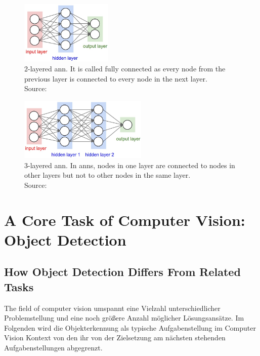 \documentclass[
			   fontsize=11pt,
               paper=a4,
               bibliography=totoc,
               idxtotoc,
               headsepline,
               footsepline,
               footinclude=false,
               BCOR=12mm,
               DIV=13,
               openany,   %
               ]
               {scrbook}
\begin{document}
\begin{multicols}{2} %
	\begin{figure}[H] %
		\centering
		\includegraphics[height=3cm]{figures/ann1.jpeg}
		\caption[2-Layered ANN]{2-layered \gls{ann}. It is called fully connected as every node from the previous layer is connected to every node in the next layer. \\
			\tiny{Source:~\cite{annGraphics}}}
		\label{fig:2layeredANN} %
	\end{figure}
	
	\columnbreak    %
	
	\begin{figure}[H] %
		\centering
		\includegraphics[height=3cm]{figures/ann2.jpeg}
		\caption[3-Layered ANN]{3-layered \gls{ann}. In \glspl{ann}, nodes in one layer are connected to nodes in other layers but not to other nodes in the same layer. \\
			\tiny{Source:~\cite{annGraphics}}}
		\label{fig:3layeredANN} %
	\end{figure}
\end{multicols}

\section{A Core Task of Computer Vision: Object Detection}

\subsection{How Object Detection Differs From Related Tasks}

The field of computer vision umspannt eine Vielzahl unterschiedlicher Problemstellung und eine noch größere Anzahl möglicher Lösungsansätze. Im Folgenden wird die Objekterkennung als typische Aufgabenstellung im Computer Vision Kontext von den ihr von der Zielsetzung am nächsten stehenden Aufgabenstellungen abgegrenzt.
\end{document}
